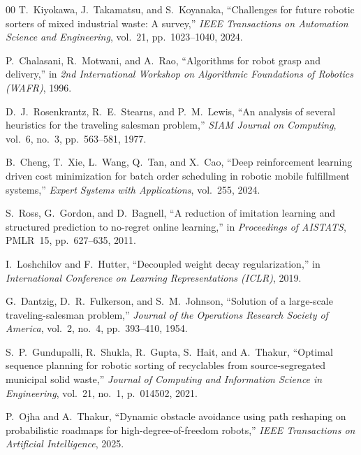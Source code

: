 \documentclass[conference]{IEEEtran}
\begin{document}
\begin{thebibliography}{00}
 T.~Kiyokawa, J.~Takamatsu, and S.~Koyanaka, ``Challenges for future robotic sorters of mixed industrial waste: A survey,'' \emph{IEEE Transactions on Automation Science and Engineering}, vol.~21, pp.~1023--1040, 2024.

 P.~Chalasani, R.~Motwani, and A.~Rao, ``Algorithms for robot grasp and delivery,'' in \emph{2nd International Workshop on Algorithmic Foundations of Robotics (WAFR)}, 1996.

 D.~J.~Rosenkrantz, R.~E.~Stearns, and P.~M.~Lewis, ``An analysis of several heuristics for the traveling salesman problem,'' \emph{SIAM Journal on Computing}, vol.~6, no.~3, pp.~563--581, 1977.

 B.~Cheng, T.~Xie, L.~Wang, Q.~Tan, and X.~Cao, ``Deep reinforcement learning driven cost minimization for batch order scheduling in robotic mobile fulfillment systems,'' \emph{Expert Systems with Applications}, vol.~255, 2024.

 S.~Ross, G.~Gordon, and D.~Bagnell, ``A reduction of imitation learning and structured prediction to no-regret online learning,'' in \emph{Proceedings of AISTATS}, PMLR~15, pp.~627--635, 2011.

 I.~Loshchilov and F.~Hutter, ``Decoupled weight decay regularization,'' in \emph{International Conference on Learning Representations (ICLR)}, 2019.

 G.~Dantzig, D.~R.~Fulkerson, and S.~M.~Johnson, ``Solution of a large-scale traveling-salesman problem,'' \emph{Journal of the Operations Research Society of America}, vol.~2, no.~4, pp.~393--410, 1954.

 S.~P.~Gundupalli, R.~Shukla, R.~Gupta, S.~Hait, and A.~Thakur, ``Optimal sequence planning for robotic sorting of recyclables from source-segregated municipal solid waste,'' \emph{Journal of Computing and Information Science in Engineering}, vol.~21, no.~1, p.~014502, 2021.

 P.~Ojha and A.~Thakur, ``Dynamic obstacle avoidance using path reshaping on probabilistic roadmaps for high-degree-of-freedom robots,'' \emph{IEEE Transactions on Artificial Intelligence}, 2025.

\end{thebibliography}
\end{document}
